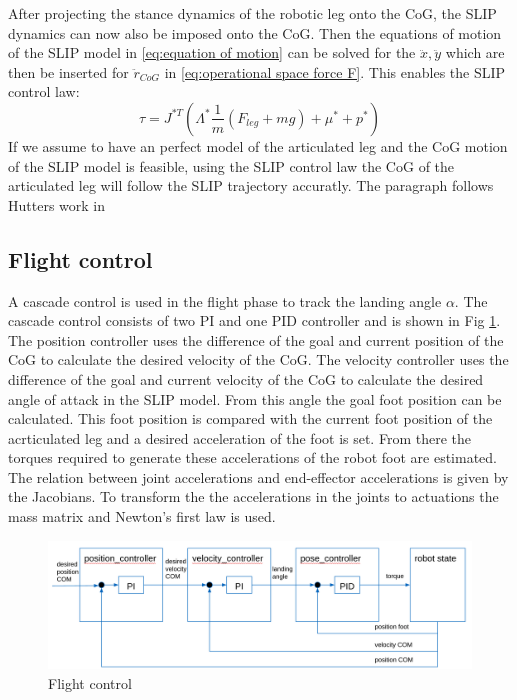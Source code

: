 \documentclass[10pt, conference]{IEEEtran}
\begin{document}
After projecting the stance dynamics of the robotic leg onto the CoG, the SLIP dynamics can now also be imposed onto the CoG. Then the equations of motion of the SLIP model 
in \ref{eq:equation of motion} can be solved for the \(\ddot{x}, \ddot{y}\) which are then be inserted for \({\ddot{r}}_{CoG}\) in \ref{eq:operational space force F}. This 
enables the SLIP control law:
\begin{equation}
   \tau = {J}^{*T} ({\Lambda}^{*} \frac{1}{m} ({F}_{leg} + mg) + {\mu}^{*} + {p}^{*})
\end{equation}
If we assume to have an perfect model of the articulated leg and the CoG motion of the SLIP model is feasible, using the SLIP control law the CoG of the articulated leg will 
follow the SLIP trajectory accuratly. The paragraph follows Hutters work in \cite{Hutter2010}


\subsection{Flight control}
A cascade control is used in the flight phase to track the landing angle \(\alpha\). The cascade control consists of two PI and one PID controller and is shown in Fig \ref{fig:cascade}. 
The position controller uses the difference of the goal and current position of the CoG to calculate the desired velocity of the CoG. The velocity controller uses 
the difference of the goal and current velocity of the CoG to calculate the desired angle of attack in the SLIP model. From this angle the goal foot position can be 
calculated. This foot position is compared with the current foot position of the acrticulated leg and a desired acceleration of the foot is set. From there the torques 
required to generate these accelerations of the robot foot are estimated. The relation between joint accelerations and end-effector accelerations is given by the 
Jacobians. To transform the the accelerations in the joints to actuations the mass matrix and Newton's first law is used.

\begin{figure}[h]
   \centering
   \includegraphics[scale=0.11]{"assets/cascade.png"}
   \caption{Flight control}
   \label{fig:cascade}
\end{figure}
\end{document}

